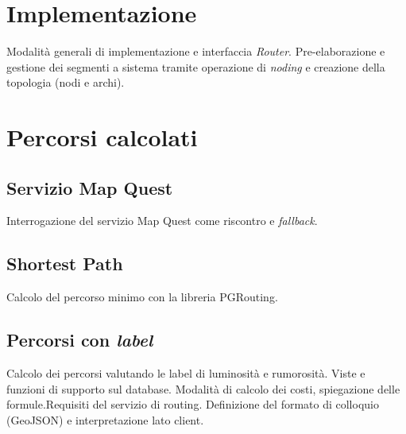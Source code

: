 \section{Implementazione}
Modalità generali di implementazione e interfaccia \emph{Router}.
Pre-elaborazione e gestione dei segmenti a sistema tramite operazione di \emph{noding} e creazione della topologia (nodi e archi).
\section{Percorsi calcolati}
\subsection{Servizio Map Quest}
Interrogazione del servizio Map Quest come riscontro e \emph{fallback}. 
\subsection{Shortest Path}
Calcolo del percorso minimo con la libreria PGRouting.
\subsection{Percorsi con \emph{label}}
Calcolo dei percorsi valutando le label di luminosità e rumorosità. Viste e funzioni di supporto sul database. Modalità di calcolo dei costi, spiegazione delle formule.Requisiti del servizio di routing. Definizione del formato di colloquio (GeoJSON) e interpretazione lato client.